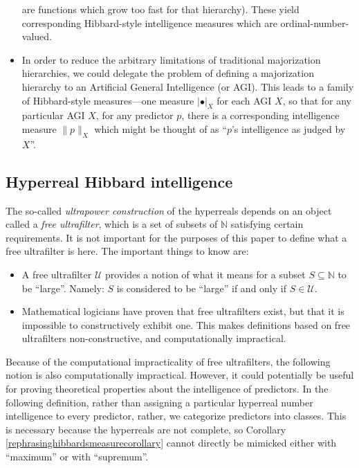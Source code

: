 \documentclass{article}
\begin{document}
\begin{itemize}
    are functions which grow too fast for that hierarchy). These yield corresponding
    Hibbard-style intelligence measures which are ordinal-number-valued.
    \item
    In order to reduce the arbitrary limitations of traditional majorization
    hierarchies, we could delegate the problem of defining a majorization hierarchy to
    an Artificial General Intelligence (or AGI). This leads to a family of Hibbard-style
    measures---one measure
    $|\bullet|_X$ for each AGI $X$, so that for any particular AGI $X$, for any
    predictor $p$, there is a corresponding intelligence measure $\|p\|_X$ which might be
    thought of as ``$p$'s intelligence as judged by $X$''.
\end{itemize}

\subsection{Hyperreal Hibbard intelligence}

The so-called \emph{ultrapower construction} of the hyperreals depends on an object
called a \emph{free ultrafilter}, which is a set of subsets of $\mathbb N$ satisfying
certain requirements. It is not important for the purposes of this paper to define what
a free ultrafilter is here. The important things to know are:
\begin{itemize}
    \item
    A free ultrafilter $\mathscr U$ provides a notion of what it means for a subset
    $S\subseteq\mathbb N$ to be ``large''. Namely: $S$ is considered to be ``large''
    if and only if $S\in \mathscr U$.
    \item
    Mathematical logicians have proven that free ultrafilters exist, but that it is
    impossible to constructively exhibit one. This makes definitions based on free
    ultrafilters non-constructive, and computationally impractical.
\end{itemize}

Because of the computational impracticality of free ultrafilters, the following notion
is also computationally impractical. However, it could potentially be useful for
proving theoretical properties about the intelligence of predictors. In the following
definition, rather than assigning a particular hyperreal number intelligence to every
predictor, rather, we categorize predictors into classes. This is necessary because
the hyperreals are not complete, so Corollary \ref{rephrasinghibbardsmeasurecorollary}
cannot directly be mimicked either with ``maximum'' or with ``supremum''.
\end{document}
